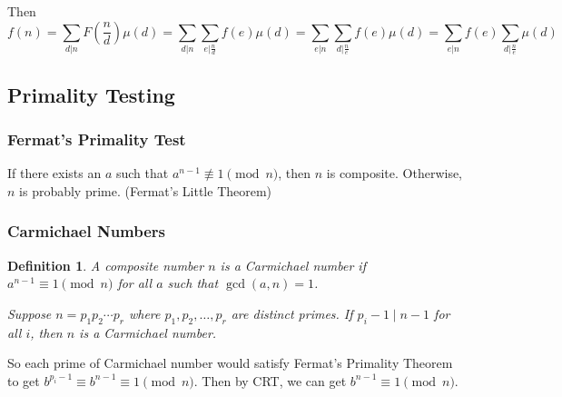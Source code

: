 \documentclass[letterpaper,12pt,oneside]{article}
\newtheorem{definition}{Definition}
\begin{document}
Then \[
        f(n)=\sum_{d|n}F(\frac{n}{d})\mu(d)=\sum_{d|n}\sum_{e|\frac{n}{d}}f(e)\mu(d)=\sum_{e|n}\sum_{d|\frac{n}{e}}f(e)\mu(d)=\sum_{e|n}f(e)\sum_{d|\frac{n}{e}}\mu(d)
    \]

\subsection{Primality Testing}
\subsubsection{Fermat's Primality Test}
If there exists an $a$ such that $a^{n-1}\not\equiv 1\pmod{n}$, then $n$ is composite. Otherwise, $n$ is probably prime. (Fermat's Little Theorem)

\subsubsection{Carmichael Numbers}
\begin{definition}
    A composite number $n$ is a Carmichael number if $a^{n-1}\equiv 1\pmod{n}$ for all $a$ such that $\gcd(a,n) = 1$.

    Suppose $n=p_1 p_2 \cdots p_r$ where $p_1,p_2,\ldots,p_r$ are distinct primes. If $p_i -1\mid n-1$ for all $i$, then $n$ is a Carmichael number.
\end{definition}
So each prime of Carmichael number would satisfy Fermat's Primality Theorem to get $b^{p_i-1} \equiv b^{n-1}\equiv 1\pmod{n}$. Then by CRT, we can get $b^{n-1}\equiv 1\pmod{n}$.
\end{document}
